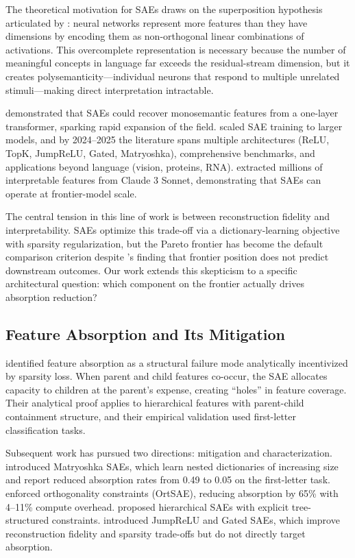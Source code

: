 \documentclass{article}
\begin{document}
The theoretical motivation for SAEs draws on the superposition hypothesis articulated by \citet{elhage2022superposition}: neural networks represent more features than they have dimensions by encoding them as non-orthogonal linear combinations of activations. This overcomplete representation is necessary because the number of meaningful concepts in language far exceeds the residual-stream dimension, but it creates polysemanticity---individual neurons that respond to multiple unrelated stimuli---making direct interpretation intractable.

\citet{bricken2023monosemanticity} demonstrated that SAEs could recover monosemantic features from a one-layer transformer, sparking rapid expansion of the field. \citet{cunningham2023sparse} scaled SAE training to larger models, and by 2024--2025 the literature spans multiple architectures (ReLU, TopK, JumpReLU, Gated, Matryoshka), comprehensive benchmarks, and applications beyond language (vision, proteins, RNA). \citet{templeton2024scaling} extracted millions of interpretable features from Claude 3 Sonnet, demonstrating that SAEs can operate at frontier-model scale.

The central tension in this line of work is between reconstruction fidelity and interpretability. SAEs optimize this trade-off via a dictionary-learning objective with sparsity regularization, but the Pareto frontier has become the default comparison criterion despite \citeauthor{karvonen2025saebench}'s finding that frontier position does not predict downstream outcomes. Our work extends this skepticism to a specific architectural question: which component on the frontier actually drives absorption reduction?

\subsection{Feature Absorption and Its Mitigation}

\citet{chanin2024feature} identified feature absorption as a structural failure mode analytically incentivized by sparsity loss. When parent and child features co-occur, the SAE allocates capacity to children at the parent's expense, creating ``holes'' in feature coverage. Their analytical proof applies to hierarchical features with parent-child containment structure, and their empirical validation used first-letter classification tasks.

Subsequent work has pursued two directions: mitigation and characterization. \citet{bussmann2025matryoshka} introduced Matryoshka SAEs, which learn nested dictionaries of increasing size and report reduced absorption rates from 0.49 to 0.05 on the first-letter task. \citet{korznikov2025ortsae} enforced orthogonality constraints (OrtSAE), reducing absorption by 65\% with 4--11\% compute overhead. \citet{zhan2026hierarchical} proposed hierarchical SAEs with explicit tree-structured constraints. \citet{rajamanoharan2024jumprelu} introduced JumpReLU and Gated SAEs, which improve reconstruction fidelity and sparsity trade-offs but do not directly target absorption.
\end{document}
